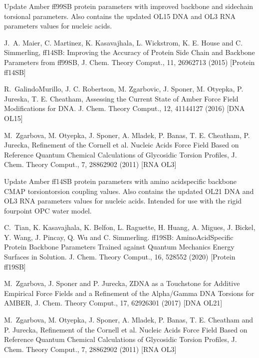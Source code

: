 \documentclass[letterpaper,11pt,english]{sphinxmanual}
\begin{document}
\sphinxAtStartPar
{}

\sphinxAtStartPar
Update Amber ff99SB protein parameters with improved backbone and sidechain torsional parameters. Also contains the updated OL15 DNA and OL3 RNA parameters values for nucleic acids.

\sphinxAtStartPar
J. A. Maier, C. Martinez, K. Kasavajhala, L. Wickstrom, K. E. House and C. Simmerling, ff14SB: Improving the Accuracy of Protein Side Chain
and Backbone Parameters from ff99SB, J. Chem. Theory Comput., 11, 2696\sphinxhyphen{}2713 (2015)  {[}Protein ff14SB{]}

\sphinxAtStartPar
R. Galindo\sphinxhyphen{}Murillo, J. C. Robertson, M. Zgarbovic, J. Sponer, M. Otyepka, P. Jureska, T. E. Cheatham, Assessing the Current State of Amber Force Field Modifications for DNA. J. Chem. Theory Comput., 12, 4114\textendash{}4127 (2016)  {[}DNA OL15{]}

\sphinxAtStartPar
M. Zgarbova, M. Otyepka, J. Sponer, A. Mladek, P. Banas, T. E. Cheatham, P. Jurecka, Refinement of the Cornell et al. Nucleic Acids Force Field Based on Reference Quantum Chemical Calculations of Glycosidic Torsion Profiles, J. Chem. Theory Comput., 7, 2886\textendash{}2902 (2011)  {[}RNA OL3{]}

\sphinxAtStartPar
{}

\sphinxAtStartPar
Update Amber ff14SB protein parameters with amino acid\sphinxhyphen{}specific backbone CMAP torsion\sphinxhyphen{}torsion coupling values. Also contains the updated OL21 DNA and OL3 RNA parameters values for nucleic acids. Intended for use with the rigid four\sphinxhyphen{}point OPC water model.

\sphinxAtStartPar
C. Tian, K. Kasavajhala, K. Belfon, L. Raguette, H. Huang, A. Migues, J. Bickel, Y. Wang, J. Pincay, Q. Wu and C. Simmerling. ff19SB: Amino\sphinxhyphen{}Acid\sphinxhyphen{}Specific Protein Backbone Parameters Trained against Quantum Mechanics Energy Surfaces in Solution. J. Chem. Theory Comput., 16, 528\textendash{}552 (2020)  {[}Protein ff19SB{]}

\sphinxAtStartPar
M. Zgarbova, J. Sponer and P. Jurecka, Z\sphinxhyphen{}DNA as a Touchstone for Additive Empirical Force Fields and a Refinement of the Alpha/Gamma DNA Torsions for AMBER, J. Chem. Theory Comput., 17, 6292\textendash{}6301 (2017)  {[}DNA OL21{]}

\sphinxAtStartPar
M. Zgarbova, M. Otyepka, J. Sponer, A. Mladek, P. Banas, T. E. Cheatham and P. Jurecka, Refinement of the Cornell et al. Nucleic Acids Force Field Based on Reference Quantum Chemical Calculations of Glycosidic Torsion Profiles, J. Chem. Theory Comput., 7, 2886\textendash{}2902 (2011)  {[}RNA OL3{]}
\end{document}
